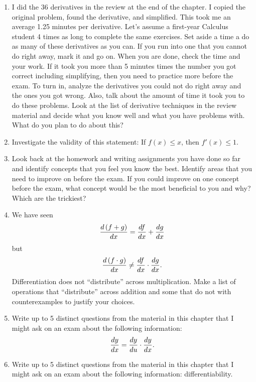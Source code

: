 \begin{enumerate}
\item  I did the 36 derivatives in the review at the end of the chapter.  I copied the original problem, found the derivative, and simplified.  This took me an average 1.25 minutes per derivative.  Let's assume a first-year Calculus student 4 times as long to complete the same exercises.  Set aside a time a do as many of these derivatives as you can.  If you run into one that you cannot do right away, mark it and go on.  When you are done, check the time and your work.  If it took you more than 5 minutes times the number you got correct including simplifying, then you need to practice more before the exam. 
 To turn in, analyze the derivatives you could not do right away and the ones you got wrong.  Also, talk about the amount of time it took you to do these problems.  Look at the list of derivative techniques in the review material and decide what you know well and what you have problems with.  What do you plan to do about this?

\item  Investigate the validity of this statement:   If $f(x) \le x$, then $f'(x) \le 1.$

\item  Look back at the homework and writing assignments you have done so far and identify concepts that you feel you know the best.  Identify areas that you need to improve on before the exam.  If you could improve on one concept before the exam, what concept would be the most beneficial to you and why? Which are the trickiest?

\item  We have seen $${{d\left( {f + g} \right)} \over {dx}} = {{df} \over {dx}} + {{dg} \over {dx}}$$ but $${{d\left( {f \cdot g} \right)} \over {dx}} \ne {{df} \over {dx}} \cdot {{dg} \over {dx}}.$$  Differentiation does not ``distribute'' across multiplication.  Make a list of operations that ``distribute'' across addition and some that do not with counterexamples to justify your choices.

\item  Write up to 5 distinct questions from the material in this chapter that I might ask on an exam about the following information:  $${{dy} \over {dx}} = {{dy} \over {du}} \cdot {{dy} \over {dx}}.$$

\item  Write up to 5 distinct questions from the material in this chapter that I might ask on an exam about the following information:  differentiability.


\end{enumerate}
